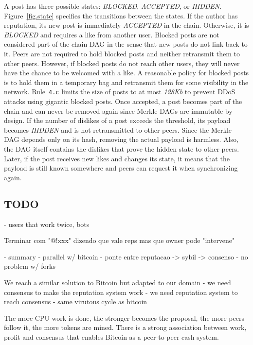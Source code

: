 \documentclass[10pt,journal,compsoc]{IEEEtran}
\begin{document}
A post has three possible states: \emph{BLOCKED}, \emph{ACCEPTED}, or
\emph{HIDDEN}.
Figure~\ref{fig.state} specifies the transitions between the states.
%
If the author has reputation, its new post is immediately \emph{ACCEPTED} in
the chain.
Otherwise, it is \emph{BLOCKED} and requires a like from another user.
Blocked posts are not considered part of the chain DAG in the sense that new
posts do not link back to it.
%
Peers are not required to hold blocked posts and neither retransmit them to
other peers.
However, if blocked posts do not reach other users, they will never have the
chance to be welcomed with a like.
A reasonable policy for blocked posts is to hold them in a temporary bag and
retransmit them for some visibility in the network.
Rule~\texttt{4.c} limits the size of posts to at most \emph{128Kb} to prevent
DDoS attacks using gigantic blocked posts.
%
Once accepted, a post becomes part of the chain and can never be removed
again since Merkle DAGs are immutable by design.
%
If the number of dislikes of a post exceeds the threshold, its payload becomes
\emph{HIDDEN} and is not retransmitted to other peers.
Since the Merkle DAG depends only on its hash, removing the actual payload is
harmless.
Also, the DAG itself contains the dislikes that prove the hidden state to other
peers.
Later, if the post receives new likes and changes its state, it means that the
payload is still known somewhere and peers can request it when synchronizing
again.

\subsection{TODO}

- users that work twice, bots

Terminar com "@!xxx" dizendo que vale reps mas que owner pode "intervene"

- summary
    - parallel w/ bitcoin
        - ponte entre reputacao -> sybil -> consenso
    - no problem w/ forks

We reach a similar solution to Bitcoin but adapted to our domain
- we need consensus to make the reputation system work
- we need reputation system to reach consensus
- same virutous cycle as bitcoin

The more CPU work is done, the stronger becomes the proposal, the more peers
follow it, the more tokens are mined.
There is a strong association between work, profit and consensus that enables
Bitcoin as a peer-to-peer cash system.
\end{document}
